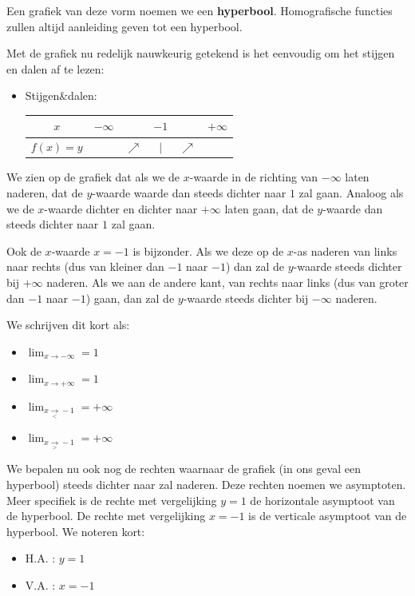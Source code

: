 \documentclass[12pt]{article}
\begin{document}
Een grafiek van deze vorm noemen we een {\bf hyperbool}. Homografische functies zullen altijd aanleiding geven tot een hyperbool.

Met de grafiek nu redelijk nauwkeurig getekend is het eenvoudig om het stijgen en dalen af te lezen:

\begin{itemize}
  \item Stijgen\&dalen:
  \begin{center}
    \begin{tabular}{c|ccccc}
      $x$ & $-\infty$ & & $-1$ & & $+\infty$\\
      \hline
      $f(x)=y$ & & $\nearrow$ & $|$ & $\nearrow$ &
    \end{tabular}
  \end{center}
\end{itemize}

We zien op de grafiek dat als we de $x$-waarde in de richting van $-\infty$ laten naderen, dat de $y$-waarde waarde dan steeds dichter naar $1$ zal gaan. Analoog als we de $x$-waarde dichter en dichter naar $+\infty$ laten gaan, dat de $y$-waarde dan steeds dichter naar $1$ zal gaan.

Ook de $x$-waarde $x=-1$ is bijzonder. Als we deze op de $x$-as naderen van links naar rechts (dus van kleiner dan $-1$ naar $-1$) dan zal de $y$-waarde steeds dichter bij $+\infty$ naderen. Als we aan de andere kant, van rechts naar links (dus van groter dan $-1$ naar $-1$) gaan, dan zal de $y$-waarde steeds dichter bij $-\infty$ naderen.

We schrijven dit kort als:

\begin{itemize}
  \item $\displaystyle\lim_{x\to -\infty}=1$
  \item $\displaystyle\lim_{x\to +\infty}=1$
  \item $\displaystyle\lim_{x\underset{<}{\to} -1}=+\infty$
  \item $\displaystyle\lim_{x\underset{>}{\to} -1}=+\infty$
\end{itemize}

We bepalen nu ook nog de rechten waarnaar de grafiek (in ons geval een hyperbool) steeds dichter naar zal naderen. Deze rechten noemen we asymptoten. Meer specifiek is de rechte met vergelijking $y=1$ de horizontale asymptoot van de hyperbool. De rechte met vergelijking $x=-1$ is de verticale asymptoot van de hyperbool. We noteren kort:

\begin{itemize}
  \item H.A. : $y=1$
  \item V.A. : $x=-1$
\end{itemize}
\end{document}
